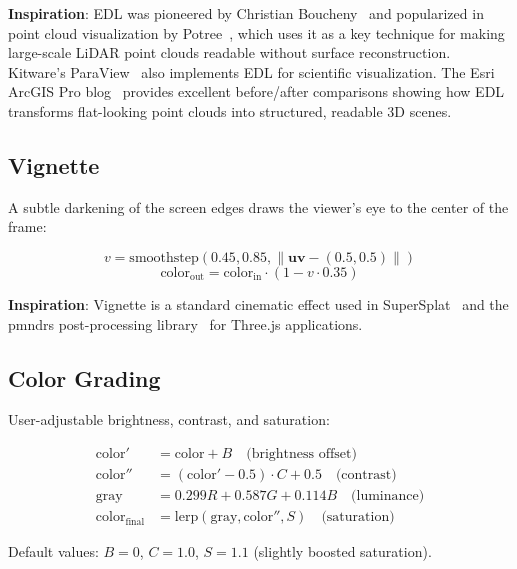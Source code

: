 \documentclass[11pt, letterpaper]{article}
\begin{document}
\textbf{Inspiration}: EDL was pioneered by Christian Boucheny~\cite{boucheny2009} and popularized in point cloud visualization by Potree~\cite{potree}, which uses it as a key technique for making large-scale LiDAR point clouds readable without surface reconstruction. Kitware's ParaView~\cite{kitware_edl} also implements EDL for scientific visualization. The Esri ArcGIS Pro blog~\cite{esri_edl} provides excellent before/after comparisons showing how EDL transforms flat-looking point clouds into structured, readable 3D scenes.

\subsection{Vignette}

A subtle darkening of the screen edges draws the viewer's eye to the center of the frame:

\begin{equation}
    v = \text{smoothstep}(0.45, 0.85, \|\mathbf{uv} - (0.5, 0.5)\|)
\end{equation}
\begin{equation}
    \text{color}_{\text{out}} = \text{color}_{\text{in}} \cdot (1 - v \cdot 0.35)
\end{equation}

\textbf{Inspiration}: Vignette is a standard cinematic effect used in SuperSplat~\cite{supersplat} and the pmndrs post-processing library~\cite{pmndrs_postprocessing} for Three.js applications.

\subsection{Color Grading}

User-adjustable brightness, contrast, and saturation:

\begin{align}
    \text{color}' &= \text{color} + B \quad \text{(brightness offset)} \\
    \text{color}'' &= (\text{color}' - 0.5) \cdot C + 0.5 \quad \text{(contrast)} \\
    \text{gray} &= 0.299R + 0.587G + 0.114B \quad \text{(luminance)} \\
    \text{color}_{\text{final}} &= \text{lerp}(\text{gray}, \text{color}'', S) \quad \text{(saturation)}
\end{align}

Default values: $B = 0$, $C = 1.0$, $S = 1.1$ (slightly boosted saturation).
\end{document}
